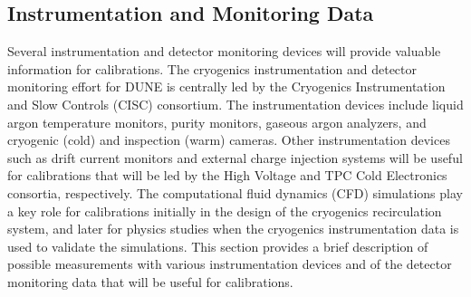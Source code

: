 
\subsection{Instrumentation and Monitoring Data }
\label{sec:inst}
Several instrumentation and detector monitoring devices %
will provide valuable information for calibrations. %
The cryogenics instrumentation and detector monitoring effort for DUNE is centrally led by the Cryogenics Instrumentation and Slow Controls (CISC) consortium. The %
instrumentation devices include liquid argon temperature monitors, \lar purity monitors, gaseous argon analyzers, and cryogenic (cold) and inspection (warm) cameras. %
Other instrumentation devices such as drift  current monitors and external charge injection systems %
will be useful for calibrations that will be led by the High Voltage and TPC Cold Electronics consortia, respectively. The computational fluid dynamics (CFD) simulations play a key role for calibrations initially in the design of the cryogenics recirculation system, and later for %
physics studies when the cryogenics instrumentation data is used to validate the simulations. This section provides a brief description of possible measurements with various instrumentation devices and %
of the detector monitoring data that will be useful for calibrations.


